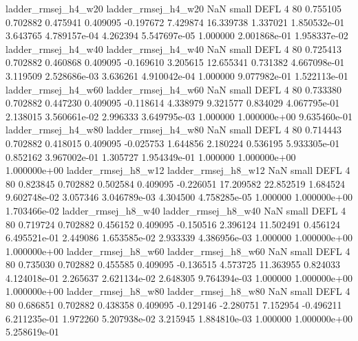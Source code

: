      ladder_rmsej_h4_w20      ladder_rmsej_h4_w20                   NaN      small     DEFL                 4 80 0.755105       0.702882 0.475941       0.409095   -0.197672      7.429874     16.339738     1.337021   1.850532e-01  3.643765 4.789157e-04     4.262394   5.547697e-05            1.000000    2.001868e-01        1.958337e-02
     ladder_rmsej_h4_w40      ladder_rmsej_h4_w40                   NaN      small     DEFL                 4 80 0.725413       0.702882 0.460868       0.409095   -0.169610      3.205615     12.655341     0.731382   4.667098e-01  3.119509 2.528686e-03     3.636261   4.910042e-04            1.000000    9.077982e-01        1.522113e-01
     ladder_rmsej_h4_w60      ladder_rmsej_h4_w60                   NaN      small     DEFL                 4 80 0.733380       0.702882 0.447230       0.409095   -0.118614      4.338979      9.321577     0.834029   4.067795e-01  2.138015 3.560661e-02     2.996333   3.649795e-03            1.000000    1.000000e+00        9.635460e-01
     ladder_rmsej_h4_w80      ladder_rmsej_h4_w80                   NaN      small     DEFL                 4 80 0.714443       0.702882 0.418015       0.409095   -0.025753      1.644856      2.180224     0.536195   5.933305e-01  0.852162 3.967002e-01     1.305727   1.954349e-01            1.000000    1.000000e+00        1.000000e+00
     ladder_rmsej_h8_w12      ladder_rmsej_h8_w12                   NaN      small     DEFL                 4 80 0.823845       0.702882 0.502584       0.409095   -0.226051     17.209582     22.852519     1.684524   9.602748e-02  3.057346 3.046789e-03     4.304500   4.758285e-05            1.000000    1.000000e+00        1.703466e-02
     ladder_rmsej_h8_w40      ladder_rmsej_h8_w40                   NaN      small     DEFL                 4 80 0.719724       0.702882 0.456152       0.409095   -0.150516      2.396124     11.502491     0.456124   6.495521e-01  2.449086 1.653585e-02     2.933339   4.386956e-03            1.000000    1.000000e+00        1.000000e+00
     ladder_rmsej_h8_w60      ladder_rmsej_h8_w60                   NaN      small     DEFL                 4 80 0.735030       0.702882 0.455585       0.409095   -0.136515      4.573725     11.363955     0.824033   4.124018e-01  2.265637 2.621134e-02     2.648305   9.764394e-03            1.000000    1.000000e+00        1.000000e+00
     ladder_rmsej_h8_w80      ladder_rmsej_h8_w80                   NaN      small     DEFL                 4 80 0.686851       0.702882 0.438358       0.409095   -0.129146     -2.280751      7.152954    -0.496211   6.211235e-01  1.972260 5.207938e-02     3.215945   1.884810e-03            1.000000    1.000000e+00        5.258619e-01
